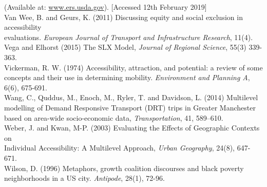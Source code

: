 \documentclass[a4paper,UKenglish]{lipics-v2018}
\begin{document}
\indent (Available at: \href{https://www.ers.usda.gov/data-products/commuting-zones-and-labor-market-areas/}{www.ers.usda.gov}). [Accessed 12th February 2019]\\
Van Wee, B. and Geurs, K. (2011) Discussing equity and social exclusion in accessibility \\
\indent evaluations. \textit{European Journal of Transport and Infrastructure Research}, 11(4). \\
Vega and Elhorst (2015) The SLX Model, \textit{Journal of Regional Science}, 55(3) 339-363. \\
Vickerman, R. W. (1974) Accessibility, attraction, and potential: a review of some concepts
\indent and their use in determining mobility. \textit{Environment and Planning A}, 6(6), 675-691. \\
Wang, C., Quddus, M., Enoch, M., Ryler, T. and Davidson, L. (2014) Multilevel modelling 
\indent of Demand Responsive Transport (DRT) trips in Greater Manchester based on area-wide
\indent socio-economic data, \textit{Transportation}, 41, 589–610. \\
Weber, J. and Kwan, M-P. (2003) Evaluating the Effects of Geographic Contexts on \\
\indent Individual Accessibility: A Multilevel Approach, \textit{Urban Geography}, 24(8), 647-671. \\
Wilson, D. (1996) Metaphors, growth coalition discourses and black poverty neighborhoods 
\indent in a US city. \textit{Antipode}, 28(1), 72-96.
\end{document}
